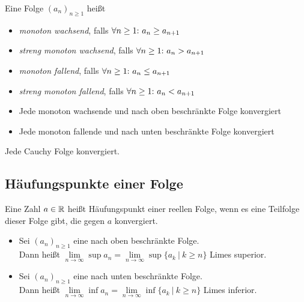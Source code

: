 \begin{frameddefn}
	Eine Folge $(a_n)_{n\geq 1}$ heißt
	\begin{itemize}
		\item \textit{monoton wachsend}, falls $\forall n \geq 1{:}\  a_n \geq a_{n+1}$
		\item \textit{streng monoton wachsend}, falls $\forall n \geq 1{:}\  a_n > a_{n+1}$
		\item \textit{monoton fallend}, falls $\forall n \geq 1{:}\  a_n \leq a_{n+1}$
		\item \textit{streng monoton fallend}, falls $\forall n \geq 1{:}\  a_n < a_{n+1}$
	\end{itemize}
\end{frameddefn}


\begin{framedthm}
	\begin{itemize}
		\item Jede monoton wachsende und nach oben beschränkte Folge konvergiert
		\item Jede monoton fallende und nach unten beschränkte Folge konvergiert
	\end{itemize}
\end{framedthm}


\begin{framedthm}
	Jede Cauchy Folge konvergiert.
\end{framedthm}


\subsection{Häufungspunkte einer Folge}

\begin{frameddefn}[Häufungspunkt]
	Eine Zahl $a \in \mathbb{R}$ heißt Häufungspunkt einer reellen Folge, wenn es eine Teilfolge dieser Folge gibt, die gegen $a$ konvergiert.
\end{frameddefn}


\begin{frameddefn}
	\begin{itemize}
		\item Sei $(a_n)_{n\geq 1}$ eine nach oben beschränkte Folge.\\ Dann heißt $\lim\limits_{n \to \infty} \sup a_n = \lim\limits_{n \to \infty} \sup \{a_k \ |\ k\geq n\}$ Limes superior.
		\item Sei $(a_n)_{n\geq 1}$ eine nach unten beschränkte Folge.\\ Dann heißt $\lim\limits_{n \to \infty} \inf a_n = \lim\limits_{n \to \infty} \inf \{a_k \ |\ k\geq n\}$ Limes inferior.
	\end{itemize}
	
\end{frameddefn}

